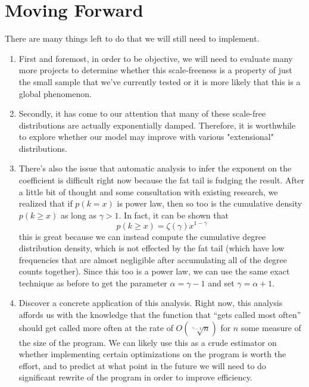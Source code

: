 \documentclass[11pt,a4paper]{article}
\begin{document}
\section*{Moving Forward}
There are many things left to do that we will still need to implement. 
\begin{enumerate}
\item 
First and 
foremost, in order to be objective, we will need to evaluate many more projects to
determine whether this scale-freeness is a property of just the small sample that 
we've currently tested or it is more likely that this is a global phenomenon.
\item 
Secondly, it has come to our attention that many of these scale-free distributions
are actually exponentially damped. Therefore, it is worthwhile to explore whether
our model may improve with various "extensional" distributions.
\item 
There's also the issue that automatic analysis to infer the exponent on the coefficient
is difficult right now because the fat tail is fudging the result. After a little bit of 
thought and some consultation with existing research, we realized that if $p(k = x)$ 
is power law, then so too is the cumulative density $p(k \ge x)$ as long as 
$\gamma > 1$. In fact, it can be shown that \cite{CLASS}
$$
p(k \ge x) = \zeta(\gamma) x^{1-\gamma}
$$
this is great because we can instead compute the cumulative degree distribution 
density, which is not effected by the fat tail (which have low frequencies that are 
almost negligible after accumulating all of the degree counts together). Since this 
too is a power law, we can use the same exact technique as before to get the 
parameter $\alpha = \gamma-1$ and set $\gamma = \alpha + 1$.
\item 
Discover a concrete application of this analysis. Right now, this analysis affords us 
with the knowledge that the function that ``gets called most often'' should get 
called more often at the rate of $O(\sqrt[\gamma-1]{n})$ for $n$ some measure of
the size of the program. We can likely use this as a crude estimator on whether 
implementing certain optimizations on the program is worth the effort, and to 
predict at what point in the future we will need to do significant rewrite of the
program in order to improve efficiency.
\end{enumerate}
\medskip

\printbibliography[title={References}]
\end{document}
